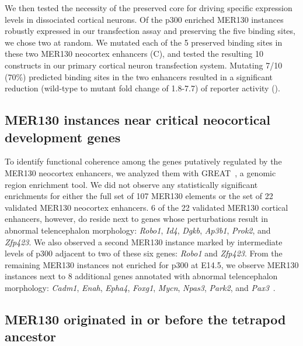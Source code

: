 We then tested the necessity of the preserved core for driving specific
expression levels in dissociated cortical neurons. Of the p300 enriched
MER130 instances robustly expressed in our transfection assay and
preserving the five binding sites, we chose two at random. We mutated
each of the 5 preserved binding sites in these two MER130 neocortex
enhancers (C), and tested the resulting 10 constructs in our
primary cortical neuron transfection system. Mutating 7/10 (70\%)
predicted binding sites in the two enhancers resulted in a significant
reduction (wild-type to mutant fold change of 1.8-7.7) of reporter
activity ().

\subsection{MER130 instances near critical neocortical development
genes}\label{mer130-instances-near-critical-neocortical-development-genes}

To identify functional coherence among the genes putatively regulated by
the MER130 neocortex enhancers, we analyzed them with
GREAT~\citep{McLean:2010iq}, a genomic region enrichment tool. We did not
observe any statistically significant enrichments for either the full
set of 107 MER130 elements or the set of 22 validated MER130 neocortex
enhancers. 6 of the 22 validated MER130 cortical enhancers, however, do
reside next to genes whose perturbations result in abnormal
telencephalon morphology: \emph{Robo1}, \emph{Id4}, \emph{Dgkb},
\emph{Ap3b1}, \emph{Prok2}, and \emph{Zfp423}. We also observed a second
MER130 instance marked by intermediate levels of p300 adjacent to two of
these six genes: \emph{Robo1} and \emph{Zfp423}. From the remaining
MER130 instances not enriched for p300 at E14.5, we observe MER130
instances next to 8 additional genes annotated with abnormal
telencephalon morphology: \emph{Cadm1}, \emph{Enah}, \emph{Epha4},
\emph{Foxg1}, \emph{Mycn}, \emph{Npas3}, \emph{Park2}, and
\emph{Pax3}~\citep{Eppig:2014ib}.

\subsection{MER130 originated in or before the tetrapod
ancestor}\label{mer130-originated-in-or-before-the-tetrapod-ancestor}

